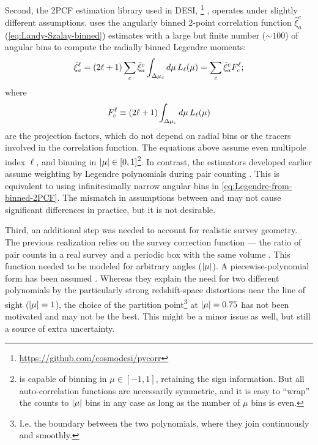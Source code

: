 Second, the 2PCF estimation library used in DESI, \pycorr{}\footnote{\url{https://github.com/cosmodesi/pycorr}} \citep{pycorr}, operates under slightly different assumptions.
\pycorr{} uses the angularly binned 2-point correlation function $\hat\xi_a^c$ (\cref{eq:Landy-Szalay-binned}) estimates with a large but finite number ($\sim 100$) of angular bins to compute the radially binned Legendre moments:
\begin{equation}
    \hat\xi^\ell_a = \qty(2\ell+1) \sum_c \hat\xi_a^c \int_{\Delta\mu_c} d\mu\, L_\ell(\mu) = \sum_c \hat\xi_a^c F^\ell_c; \label{eq:Legendre-from-binned-2PCF}
\end{equation}
where
\begin{equation}
    F^\ell_c \equiv \qty(2\ell+1) \int_{\Delta\mu_c} d\mu\, L_\ell\qty(\mu) \label{eq:Legendre-projection-factors}
\end{equation}
are the projection factors, which do not depend on radial bins or the tracers involved in the correlation function.
The equations above assume even multipole index $\ell$, and binning in $\abs{\mu}\in [0,1]$\footnote{\pycorr{} is capable of binning in $\mu\in [-1,1]$, retaining the sign information. But all auto-correlation functions are necessarily symmetric, and it is easy to ``wrap'' the counts to $\abs{\mu}$ bins in any case as long as the number of $\mu$ bins is even.}.
In contrast, the \rascalc{} estimators developed earlier assume weighting by Legendre polynomials during pair counting \citep{rascalC-legendre-3}.
This is equivalent to using infinitesimally narrow angular bins in \cref{eq:Legendre-from-binned-2PCF}.
The mismatch in assumptions between \pycorr{} and \rascalc{} may not cause significant differences in practice, but it is not desirable.

Third, an additional step was needed to account for realistic survey geometry.
The previous \rascalc{} realization relies on the survey correction function --- the ratio of pair counts in a real survey and a periodic box with the same volume \citep{survey-correction-factor-ref}.
This function needed to be modeled for arbitrary angles ($\abs{\mu}$).
A piecewise-polynomial form has been assumed \citep{rascalC-legendre-3}.
Whereas they explain the need for two different polynomials by the particularly strong redshift-space distortions near the line of sight ($\abs{\mu}=1$), the choice of the partition point\footnote{I.e. the boundary between the two polynomials, where they join continuously and smoothly.} at $\abs{\mu}=0.75$ has not been motivated and may not be the best.
This might be a minor issue as well, but still a source of extra uncertainty.

